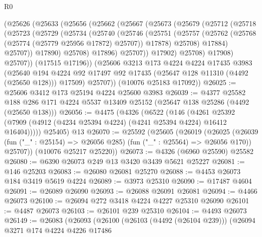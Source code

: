 \begin{lexlean}{R0}
\begin{coremodule}
      (@25626
        (@25633
          (@25656
            (@25662
              (@25667
                (@25673
                  (@25679
                    (@25712
                      (@25718
                        (@25723
                          (@25729
                            (@25734
                              (@25740
                                (@25746
                                  (@25751
                                    (@25757
                                      (@25762
                                        (@25768 (@25774 (@25779 @25956 @17872) @25707))
                                        @17878)
                                      @25708)
                                    @17884)
                                  @25707))
                              @17890)
                            @25708)
                          @17896)
                        @25707))
                    @17902)
                  @25708)
                @17908)
              @25707))
          (@17515 @17196))
        (@25606
          @3213
          @173
          @4224
          @4224
          @17435
          @3983
          (@25640
            @194
            @4224
            @92
            @17497
            @92
            @17435
            (@25647 @128 @11310 (@4492 (@25650 @128)))
            @17509)
          @25707))
      (@10076 @25183 @17092))
@26025 := @25606 @3412 @173 @25194 @4224 @25600 @3983
@26039 := @4377
    @25582
    @188
    @286
    @171
    @4224
    @5537
    @13409
    @25152
    (@25647 @138 @25286 (@4492 (@25650 @138)))
@26056 := @4475
    (@4326
      (@6522
        (@146
          (@4261 @25392 (@7909 (@4912 (@4234 @25394 @4224) (@4241 @25394 @4224) @16412 @16404)))))
      @25405)
    @13
@26070 := @25592
    (@25605
      (@26019
        (@26025
          (@26039 (fun ("_" : @25154) => @26056 @285) (fun ("_" : @25564) => @26056 @170))
          @25707))
      (@10076 @25217 @25220))
@26073 := @4326 (@6960 @25590) @25582
@26080 := @6390 @26073 @249 @13 @3420 @3439 @5621 @25227
@26081 := @146 @25203
@26083 := @26080 @26081 @25270
@26088 := @4453 @26073 @184 @3419 @5619 @4224
@26089 := @3973 @25310
@26090 := @17487 @4604
@26091 := @26089 @26090
@26093 := @26088 @26091 @26081
@26094 := @4466 @26073
@26100 := @26094 @272 @3418 @4224 @4227 @25310 @26090
@26101 := @4487 @26073
@26103 := @26101 @239 @25310
@26104 := @4493 @26073
@26149 := @26083
    (@26093
      (@26100
        (@26103 (@4492 (@26104 @239)))
        (@26094
          @3271
          @174
          @4224
          @4226
          @17486

\end{coremodule}
\end{lexlean}
